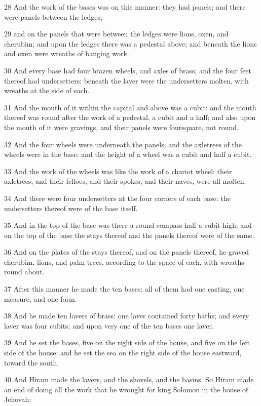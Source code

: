 \par 28 And the work of the bases was on this manner: they had panels; and there were panels between the ledges;
\par 29 and on the panels that were between the ledges were lions, oxen, and cherubim; and upon the ledges there was a pedestal above; and beneath the lions and oxen were wreaths of hanging work.
\par 30 And every base had four brazen wheels, and axles of brass; and the four feet thereof had undersetters: beneath the laver were the undersetters molten, with wreaths at the side of each.
\par 31 And the mouth of it within the capital and above was a cubit: and the mouth thereof was round after the work of a pedestal, a cubit and a half; and also upon the mouth of it were gravings, and their panels were foursquare, not round.
\par 32 And the four wheels were underneath the panels; and the axletrees of the wheels were in the base: and the height of a wheel was a cubit and half a cubit.
\par 33 And the work of the wheels was like the work of a chariot wheel: their axletrees, and their felloes, and their spokes, and their naves, were all molten.
\par 34 And there were four undersetters at the four corners of each base: the undersetters thereof were of the base itself.
\par 35 And in the top of the base was there a round compass half a cubit high; and on the top of the base the stays thereof and the panels thereof were of the same.
\par 36 And on the plates of the stays thereof, and on the panels thereof, he graved cherubim, lions, and palm-trees, according to the space of each, with wreaths round about.
\par 37 After this manner he made the ten bases: all of them had one casting, one measure, and one form.
\par 38 And he made ten lavers of brass: one laver contained forty baths; and every laver was four cubits; and upon very one of the ten bases one laver.
\par 39 And he set the bases, five on the right side of the house, and five on the left side of the house: and he set the sea on the right side of the house eastward, toward the south.
\par 40 And Hiram made the lavers, and the shovels, and the basins. So Hiram made an end of doing all the work that he wrought for king Solomon in the house of Jehovah:
